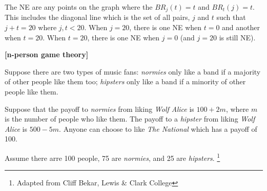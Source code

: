 \documentclass[addpoints]{exam}
\begin{document}
\begin{questions}
\begin{parts}
\begin{solution}
    The NE are any points on the graph where the $BR_j(t) = t$ and $BR_t(j) = t$.
    This includes the diagonal line which is the set of all pairs,
    $j$ and $t$ such that $j + t = 20$ where $j,t<20$.
    When $j=20$, there is one NE when $t=0$ and another when $t=20$.
    When $t=20$, there is one NE when $j=0$ (and $j=20$ is still NE).
  
  \end{solution}
\end{parts}

\newpage

\question \textbf{[n-person game theory]}

Suppose there are two types of music fans:
\textit{normies} only like a band if a majority of other people like them too;
\textit{hipsters} only like a band if a minority of other people like them.

Suppose that the payoff to \textit{normies} from liking \textit{Wolf Alice} is $100 + 2m$, where $m$ is the number of people who like them.
The payoff to a \textit{hipster} from liking \textit{Wolf Alice} is $500 - 5m$.
Anyone can choose to like \textit{The National} which has a payoff of 100.

Assume there arre 100 people, 75 are \textit{normies}, and 25 are \textit{hipsters}.
\footnote{Adapted from Cliff Bekar, Lewis \& Clark College}

\end{questions}
\end{document}

